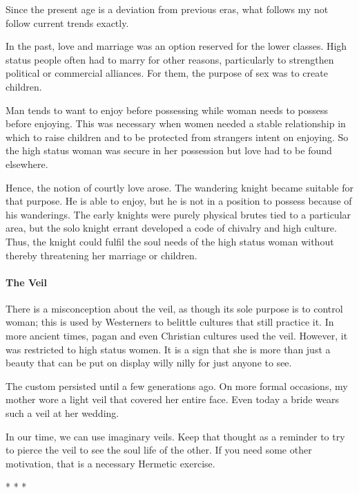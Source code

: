 Since the present age is a deviation from previous eras, what follows my not follow current trends exactly.

In the past, love and marriage was an option reserved for the lower classes. High status people often had to marry for other reasons, particularly to strengthen political or commercial alliances. For them, the purpose of sex was to create children.

Man tends to want to enjoy before possessing while woman needs to possess before enjoying. This was necessary when women needed a stable relationship in which to raise children and to be protected from strangers intent on enjoying. So the high status woman was secure in her possession but love had to be found elsewhere.

Hence, the notion of courtly love arose. The wandering knight became suitable for that purpose. He is able to enjoy, but he is not in a position to possess because of his wanderings. The early knights were purely physical brutes tied to a particular area, but the solo knight errant developed a code of chivalry and high culture. Thus, the knight could fulfil the soul needs of the high status woman without thereby threatening her marriage or children.

\paragraph{The Veil}
There is a misconception about the veil, as though its sole purpose is to control woman; this is used by Westerners to belittle cultures that still practice it. In more ancient times, pagan and even Christian cultures used the veil. However, it was restricted to high status women. It is a sign that she is more than just a beauty that can be put on display willy nilly for just anyone to see.

The custom persisted until a few generations ago. On more formal occasions, my mother wore a light veil that covered her entire face. Even today a bride wears such a veil at her wedding.

In our time, we can use imaginary veils. Keep that thought as a reminder to try to pierce the veil to see the soul life of the other. If you need some other motivation, that is a necessary Hermetic exercise.




\begin{center}* * *\end{center}

